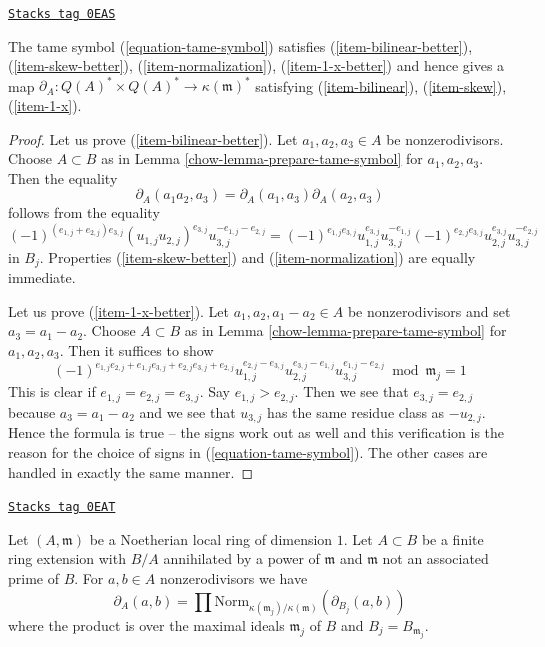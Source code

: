 \begin{lemma}
\label{chow-lemma-tame-symbol}
\href{https://stacks.math.columbia.edu/tag/0EAS}{\texttt{Stacks tag 0EAS}}

The tame symbol (\ref{equation-tame-symbol}) satisfies
(\ref{item-bilinear-better}), (\ref{item-skew-better}),
(\ref{item-normalization}), (\ref{item-1-x-better}) and hence
gives a map $\partial_A : Q(A)^* \times Q(A)^* \to \kappa(\mathfrak m)^*$
satisfying (\ref{item-bilinear}), (\ref{item-skew}), (\ref{item-1-x}).
\end{lemma}

\begin{proof}

Let us prove (\ref{item-bilinear-better}).
Let $a_1, a_2, a_3 \in A$ be nonzerodivisors.
Choose $A \subset B$ as in Lemma \ref{chow-lemma-prepare-tame-symbol}
for $a_1, a_2, a_3$. Then the equality
$$
\partial_A(a_1a_2, a_3) = \partial_A(a_1, a_3) \partial_A(a_2, a_3)
$$
follows from the equality
$$
(-1)^{(e_{1, j} + e_{2, j})e_{3, j}}
(u_{1, j}u_{2, j})^{e_{3, j}}u_{3, j}^{-e_{1, j} - e_{2, j}} =
(-1)^{e_{1, j}e_{3, j}}
u_{1, j}^{e_{3, j}}u_{3, j}^{-e_{1, j}}
(-1)^{e_{2, j}e_{3, j}}
u_{2, j}^{e_{3, j}}u_{3, j}^{-e_{2, j}}
$$
in $B_j$. Properties (\ref{item-skew-better}) and
(\ref{item-normalization}) are equally immediate.

\medskip\noindent
Let us prove (\ref{item-1-x-better}). Let $a_1, a_2, a_1 - a_2 \in A$
be nonzerodivisors and set $a_3 = a_1 - a_2$.
Choose $A \subset B$ as in Lemma \ref{chow-lemma-prepare-tame-symbol}
for $a_1, a_2, a_3$. Then it suffices to show
$$
(-1)^{e_{1, j}e_{2, j} + e_{1, j}e_{3, j} + e_{2, j}e_{3, j} + e_{2, j}}
u_{1, j}^{e_{2, j} - e_{3, j}}
u_{2, j}^{e_{3, j} - e_{1, j}}
u_{3, j}^{e_{1, j} - e_{2, j}} \bmod \mathfrak m_j = 1
$$
This is clear if $e_{1, j} = e_{2, j} = e_{3, j}$.
Say $e_{1, j} > e_{2, j}$. Then we see that $e_{3, j} = e_{2, j}$
because $a_3 = a_1 - a_2$ and we see that $u_{3, j}$
has the same residue class as $-u_{2, j}$. Hence
the formula is true -- the signs work out as well
and this verification is the reason for the choice of signs
in (\ref{equation-tame-symbol}).
The other cases are handled in exactly the same manner.
\end{proof}

\begin{lemma}
\label{chow-lemma-norm-down-tame-symbol}
\href{https://stacks.math.columbia.edu/tag/0EAT}{\texttt{Stacks tag 0EAT}}

Let $(A, \mathfrak m)$ be a Noetherian local ring of dimension $1$.
Let $A \subset B$ be a finite ring extension with $B/A$
annihilated by a power of $\mathfrak m$ and $\mathfrak m$ not
an associated prime of $B$.
For $a, b \in A$ nonzerodivisors we have
$$
\partial_A(a, b) = \prod
\text{Norm}_{\kappa(\mathfrak m_j)/\kappa(\mathfrak m)}(\partial_{B_j}(a, b))
$$
where the product is over the maximal ideals $\mathfrak m_j$ of $B$
and $B_j = B_{\mathfrak m_j}$.
\end{lemma}

